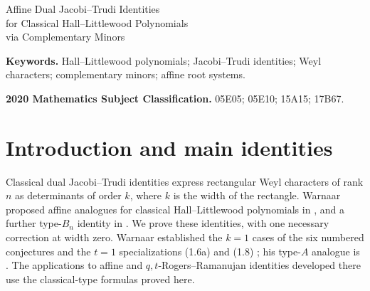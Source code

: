 \documentclass[12pt]{article}
\numberwithin{equation}{section}
\begin{document}
\begin{center}
\LARGE
Affine Dual Jacobi--Trudi Identities\\[3pt]
for Classical Hall--Littlewood Polynomials\\[3pt]
via Complementary Minors
\end{center}
\medskip

\begin{abstract}
We prove the six affine dual Jacobi--Trudi identities conjectured by
Warnaar for rectangular Hall--Littlewood polynomials of types $B_n$,
$C_n$, and $BC_n$, together with his additional type-$B_n$ identity at
$s=t$. We give a uniform proof by adapting the complementary-minor
method used by Aitken for symmetric-function duality.
\end{abstract}

\medskip
\noindent\textbf{Keywords.} Hall--Littlewood polynomials; Jacobi--Trudi
identities; Weyl characters; complementary minors; affine root systems.

\smallskip
\noindent\textbf{2020 Mathematics Subject Classification.}
05E05; 05E10; 15A15; 17B67.

\section{Introduction and main identities}

Classical dual Jacobi--Trudi identities express rectangular Weyl
characters of rank $n$ as determinants of order $k$, where $k$ is the
width of the rectangle.  Warnaar proposed affine analogues for classical
Hall--Littlewood polynomials in \cite[Conjectures~1.2--1.4]{Warnaar2026},
and a further type-$B_n$ identity in \cite[Section~6]{Warnaar2026}.
We prove these identities, with one necessary correction at width zero.
Warnaar established the $k=1$ cases of the six numbered conjectures and
the $t=1$ specializations (1.6a) and (1.8)
\cite[Lemmas~4.1--4.4]{Warnaar2026}; his type-$A$ analogue is
\cite[Theorem~1.1]{Warnaar2026}.  The applications to affine and
$q,t$-Rogers--Ramanujan identities developed there use the classical-type
formulas proved here.
\end{document}
